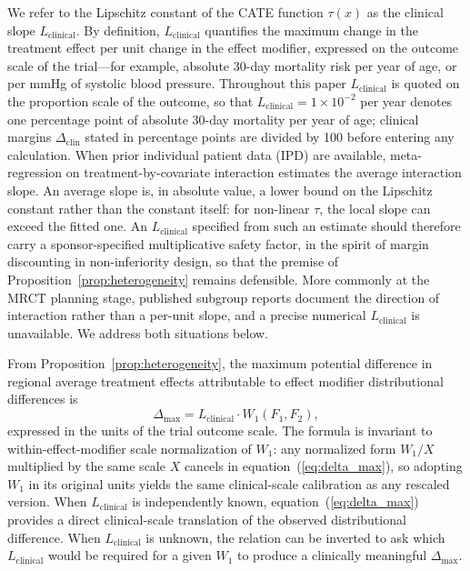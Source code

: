 \documentclass[AMA,Times1COL]{WileyNJDv5}
\begin{document}
We refer to the Lipschitz constant of the CATE function $\tau(x)$ as the clinical slope $L_{\text{clinical}}$. By definition, $L_{\text{clinical}}$ quantifies the maximum change in the treatment effect per unit change in the effect modifier, expressed on the outcome scale of the trial---for example, absolute 30-day mortality risk per year of age, or per mmHg of systolic blood pressure. Throughout this paper $L_{\text{clinical}}$ is quoted on the proportion scale of the outcome, so that $L_{\text{clinical}} = 1 \times 10^{-2}$ per year denotes one percentage point of absolute 30-day mortality per year of age; clinical margins $\Delta_{\text{clin}}$ stated in percentage points are divided by 100 before entering any calculation. When prior individual patient data (IPD) are available, meta-regression on treatment-by-covariate interaction estimates the average interaction slope.\cite{riley2010,fisher2017} An average slope is, in absolute value, a lower bound on the Lipschitz constant rather than the constant itself: for non-linear $\tau$, the local slope can exceed the fitted one. An $L_{\text{clinical}}$ specified from such an estimate should therefore carry a sponsor-specified multiplicative safety factor, in the spirit of margin discounting in non-inferiority design, so that the premise of Proposition~\ref{prop:heterogeneity} remains defensible. More commonly at the MRCT planning stage, published subgroup reports document the direction of interaction rather than a per-unit slope, and a precise numerical $L_{\text{clinical}}$ is unavailable. We address both situations below.

From Proposition~\ref{prop:heterogeneity}, the maximum potential difference in regional average treatment effects attributable to effect modifier distributional differences is
\begin{equation}
\Delta_{\max} = L_{\text{clinical}} \cdot W_1(F_1, F_2),
\label{eq:delta_max}
\end{equation}
expressed in the units of the trial outcome scale. The formula is invariant to within-effect-modifier scale normalization of $W_1$: any normalized form $W_1 / X$ multiplied by the same scale $X$ cancels in equation~(\ref{eq:delta_max}), so adopting $W_1$ in its original units yields the same clinical-scale calibration as any rescaled version. When $L_{\text{clinical}}$ is independently known, equation~(\ref{eq:delta_max}) provides a direct clinical-scale translation of the observed distributional difference. When $L_{\text{clinical}}$ is unknown, the relation can be inverted to ask which $L_{\text{clinical}}$ would be required for a given $W_1$ to produce a clinically meaningful $\Delta_{\max}$.
\end{document}
